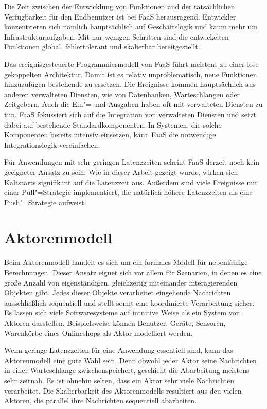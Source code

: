 Die Zeit zwischen der Entwicklung von Funktionen und der tatsächlichen Verfügbarkeit für den Endbenutzer ist bei FaaS herausragend. Entwickler konzentrieren sich nämlich hauptsächlich auf Geschäftslogik und kaum mehr um Infrastrukturaufgaben. Mit nur wenigen Schritten sind die entwickelten Funktionen global, fehlertolerant und skalierbar bereitgestellt.

Das ereignisgesteuerte Programmiermodell von FaaS führt meistens zu einer lose gekoppelten Architektur. Damit ist es relativ unproblematisch, neue Funktionen hinzuzufügen \bzw bestehende zu ersetzen. Die Ereignisse kommen hauptsächlich aus anderen verwalteten Diensten, wie \zB von Datenbanken, Warteschlangen oder Zeitgebern. Auch die Ein"= und Ausgaben haben oft mit verwalteten Diensten zu tun. \Dah FaaS fokussiert sich auf die Integration von verwalteten Diensten und setzt dabei auf bestehende Standardkomponenten. In Systemen, die solche Komponenten bereits intensiv einsetzen, kann FaaS die notwendige Integrationslogik vereinfachen.

Für Anwendungen mit sehr geringen Latenzzeiten scheint FaaS derzeit noch kein geeigneter Ansatz zu sein. Wie in dieser Arbeit gezeigt wurde, wirken sich Kaltstarts signifikant auf die Latenzzeit aus. Außerdem sind viele Ereignisse mit einer Pull"=Strategie implementiert, die natürlich höhere Latenzzeiten als eine Push"=Strategie aufweist.

\section{Aktorenmodell}

Beim Aktorenmodell handelt es sich um ein formales Modell für nebenläufige Berechnungen. Dieser Ansatz eignet sich vor allem für Szenarien, in denen es eine große Anzahl von eigenständigen, gleichzeitig miteinander interagierenden Objekten gibt. Jedes dieser Objekte verarbeitet eingehende Nachrichten ausschließlich sequentiell und stellt somit eine koordinierte Verarbeitung sicher. Es lassen sich viele Softwaresysteme auf intuitive Weise als ein System von Aktoren darstellen. Beispielsweise können Benutzer, Geräte, Sensoren, Warenkörbe eines Onlineshops \usw als Aktor modelliert werden.

Wenn geringe Latenzzeiten für eine Anwendung essentiell sind, kann das Aktorenmodell eine gute Wahl sein. Denn obwohl jeder Aktor seine Nachrichten in einer Warteschlange zwischenspeichert, geschieht die Abarbeitung meistens sehr zeitnah. Es ist ohnehin selten, dass ein Aktor sehr viele Nachrichten verarbeitet. Die Skalierbarkeit des Aktorenmodells resultiert aus den vielen Aktoren, die parallel ihre Nachrichten sequentiell abarbeiten.

